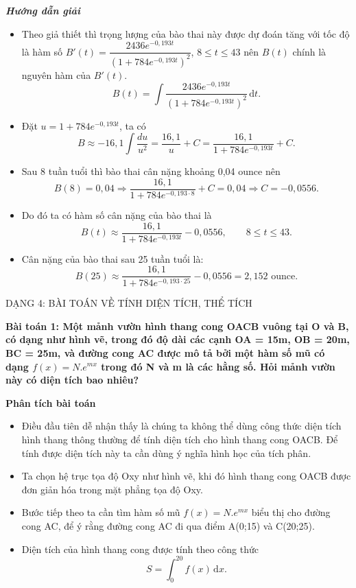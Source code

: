 \documentclass[12pt,a4paper]{article}
\newcommand{\dd}{\,\mathrm{d}}
\newcommand{\analysis}{\noindent\raisebox{0.15ex}{\rule{1.6ex}{1.6ex}}\hspace{4pt}\textbf{Phân tích bài toán}\par}
\newcommand{\solution}{\begin{center}\textbf{\textit{Hướng dẫn giải}}\end{center}\par}
\begin{document}
\solution
\begin{itemize}
\item Theo giả thiết thì trọng lượng của bào thai này được dự đoán tăng với tốc độ là hàm số
$B'(t)=\dfrac{2436e^{-0,193t}}{(1+784e^{-0,193t})^2}$, $8\le t\le43$ nên $B(t)$ chính là nguyên hàm của $B'(t)$.
\[
B(t)=\int\frac{2436e^{-0,193t}}{(1+784e^{-0,193t})^2}\dd t.
\]
\item Đặt $u=1+784e^{-0,193t}$, ta có
\[
B\approx-16,1\int\frac{du}{u^2}=\frac{16,1}{u}+C
=\frac{16,1}{1+784e^{-0,193t}}+C.
\]
\item Sau 8 tuần tuổi thì bào thai cân nặng khoảng 0,04 ounce nên
\[
B(8)=0,04\Rightarrow\frac{16,1}{1+784e^{-0,193\cdot8}}+C=0,04
\Rightarrow C=-0,0556.
\]
\item Do đó ta có hàm số cân nặng của bào thai là
\[
B(t)\approx\frac{16,1}{1+784e^{-0,193t}}-0,0556,\qquad8\le t\le43.
\]
\item Cân nặng của bào thai sau 25 tuần tuổi là:
\[
B(25)\approx\frac{16,1}{1+784e^{-0,193\cdot25}}-0,0556=2,152\text{ ounce}.
\]
\end{itemize}

\begin{dangbox}DẠNG 4: BÀI TOÁN VỀ TÍNH DIỆN TÍCH, THỂ TÍCH\end{dangbox}

\textbf{Bài toán 1: Một mảnh vườn hình thang cong OACB vuông tại O và B, có dạng như hình vẽ, trong đó độ dài các cạnh OA = 15m, OB = 20m, BC = 25m, và đường cong AC được mô tả bởi một hàm số mũ có dạng $f(x)=N.e^{mx}$ trong đó N và m là các hằng số. Hỏi mảnh vườn này có diện tích bao nhiêu?}\par\medskip
\begin{analysisbox}
\analysis
\begin{itemize}
\item Điều đầu tiên dễ nhận thấy là chúng ta không thể dùng công thức diện tích hình thang thông thường để tính diện tích cho hình thang cong OACB. Để tính được diện tích này ta cần dùng ý nghĩa hình học của tích phân.
\item Ta chọn hệ trục tọa độ Oxy như hình vẽ, khi đó hình thang cong OACB được đơn giản hóa trong mặt phẳng tọa độ Oxy.
\item Bước tiếp theo ta cần tìm hàm số mũ $f(x)=N.e^{mx}$ biểu thị cho đường cong AC, để ý rằng đường cong AC đi qua điểm A(0;15) và C(20;25).
\item Diện tích của hình thang cong được tính theo công thức
\[
S=\int_0^{20}f(x)\dd x.
\]
\end{itemize}
\end{analysisbox}
\end{document}
